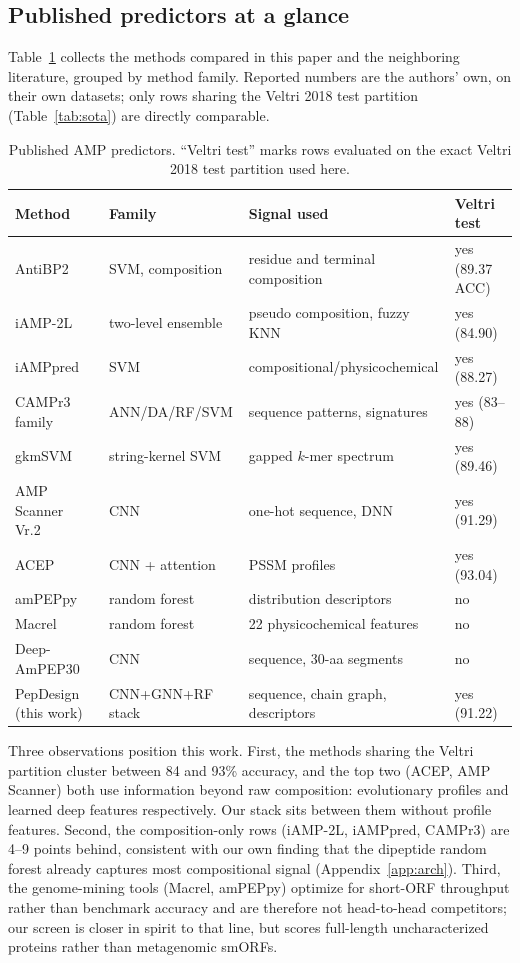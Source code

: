 
\subsection{Published predictors at a glance}
Table~\ref{tab:predictors} collects the methods compared in this paper and
the neighboring literature, grouped by method family. Reported numbers are
the authors' own, on their own datasets; only rows sharing the Veltri 2018
test partition (Table~\ref{tab:sota}) are directly comparable.

\begin{table}[h]\centering\scriptsize
\caption{Published AMP predictors. ``Veltri test'' marks rows evaluated on
the exact Veltri 2018 test partition used here.}
\label{tab:predictors}
\begin{tabular}{p{2.9cm}p{3.1cm}p{4.6cm}p{2.2cm}}
\hline
Method & Family & Signal used & Veltri test \\
\hline
AntiBP2~\cite{antibp2} & SVM, composition & residue and terminal composition & yes (89.37 ACC) \\
iAMP-2L~\cite{iamp2l} & two-level ensemble & pseudo composition, fuzzy KNN & yes (84.90) \\
iAMPpred~\cite{iamppred} & SVM & compositional/physicochemical & yes (88.27) \\
CAMPr3 family~\cite{camp} & ANN/DA/RF/SVM & sequence patterns, signatures & yes (83--88) \\
gkmSVM~\cite{gkm} & string-kernel SVM & gapped $k$-mer spectrum & yes (89.46) \\
AMP Scanner Vr.2~\cite{ampscanner} & CNN & one-hot sequence, DNN & yes (91.29) \\
ACEP~\cite{acep} & CNN + attention & PSSM profiles & yes (93.04) \\
amPEPpy~\cite{ampeppy} & random forest & distribution descriptors & no \\
Macrel~\cite{macrel} & random forest & 22 physicochemical features & no \\
Deep-AmPEP30~\cite{deepampep} & CNN & sequence, 30-aa segments & no \\
PepDesign (this work) & CNN+GNN+RF stack & sequence, chain graph, descriptors & yes (91.22) \\
\hline
\end{tabular}
\end{table}

Three observations position this work. First, the methods sharing the
Veltri partition cluster between 84 and 93\% accuracy, and the top two
(ACEP, AMP Scanner) both use information beyond raw composition:
evolutionary profiles and learned deep features respectively. Our stack
sits between them without profile features. Second, the composition-only
rows (iAMP-2L, iAMPpred, CAMPr3) are 4--9 points behind, consistent with
our own finding that the dipeptide random forest already captures most
compositional signal (Appendix~\ref{app:arch}). Third, the genome-mining
tools (Macrel, amPEPpy) optimize for short-ORF throughput rather than
benchmark accuracy and are therefore not head-to-head competitors; our
screen is closer in spirit to that line, but scores full-length
uncharacterized proteins rather than metagenomic smORFs.
